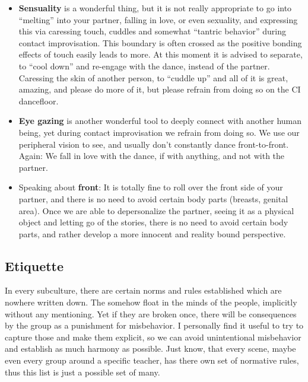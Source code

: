 \begin{itemize}
    \item \textbf{Sensuality} is a wonderful thing, but it is not really appropriate to go into ``melting'' into your partner, falling in love, or even sexuality, and expressing this via caressing touch, cuddles and somewhat ``tantric behavior'' during contact improvisation.
    This boundary is often crossed as the positive bonding effects of touch easily leads to more.
    At this moment it is advised to separate, to ``cool down'' and re-engage with the dance, instead of the partner.
    Caressing the skin of another person, to ``cuddle up'' and all of it is great, amazing, and please do more of it, but please refrain from doing so on the CI dancefloor.
    \item \textbf{Eye gazing} is another wonderful tool to deeply connect with another human being, yet during contact improvisation we refrain from doing so.
    We use our peripheral vision to see, and usually don't constantly dance front-to-front.
    Again: We fall in love with the dance, if with anything, and not with the partner.
    \item Speaking about \textbf{front}: It is totally fine to roll over the front side of your partner, and there is no need to avoid certain body parts (breasts, genital area).
    Once we are able to depersonalize the partner, seeing it as a physical object and letting go of the stories, there is no need to avoid certain body parts, and rather develop a more innocent and reality bound perspective.
\end{itemize}

\subsection{Etiquette}\label{subsec:etiquette}

In every subculture, there are certain norms and rules established which are nowhere written down.
The somehow float in the minds of the people, implicitly without any mentioning.
Yet if they are broken once, there will be consequences by the group as a punishment for misbehavior.
I personally find it useful to try to capture those and make them explicit, so we can avoid unintentional misbehavior and establish as much harmony as possible.
Just know, that every scene, maybe even every group around a specific teacher, has there own set of normative rules, thus this list is just a possible set of many.

